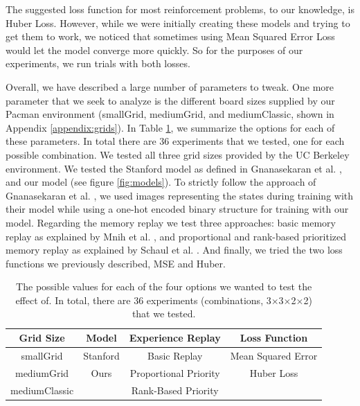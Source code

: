 \documentclass[conference]{IEEEtran}
\begin{document}
The suggested loss function for most reinforcement problems, to our knowledge, is Huber Loss. However, while we were initially creating these models and trying to get them to work, we noticed that sometimes using Mean Squared Error Loss would let the model converge more quickly. So for the purposes of our experiments, we run trials with both losses.

Overall, we have described a large number of parameters to tweak. One more parameter that we seek to analyze is the different board sizes supplied by our Pacman environment (smallGrid, mediumGrid, and mediumClassic, shown in Appendix \ref{appendix:grids}). In Table \ref{tab:experiments}, we summarize the options for each of these parameters. In total there are 36 experiments that we tested, one for each possible combination. We tested all three grid sizes provided by the UC Berkeley environment. We tested the Stanford model as defined in Gnanasekaran et al. \cite{stanford2017}, and our model (see figure \ref{fig:models}). To strictly follow the approach of Gnanasekaran et al. \cite{stanford2017}, we used images representing the states during training with their model while using a one-hot encoded binary structure for training with our model. Regarding the memory replay we test three approaches: basic memory replay as explained by Mnih et al. \cite{Mnih2015}, and proportional and rank-based prioritized memory replay as explained by Schaul et al. \cite{schaul2016prioritized}. And finally, we tried the two loss functions we previously described, MSE and Huber.

\begin{table}[]
\centering
\caption{The possible values for each of the four options we wanted to test the effect of. In total, there are 36 experiments (combinations, 3$\times$3$\times$2$\times$2) that we tested.}
\label{tab:experiments}
\begin{tabular}{c|c|c|c}
Grid Size & Model & Experience Replay & Loss Function \\ \hline
smallGrid & Stanford & Basic Replay & Mean Squared Error \\
mediumGrid & Ours & Proportional Priority & Huber Loss \\
mediumClassic &  & Rank-Based Priority &  \\
\end{tabular}
\end{table}



\end{document}
